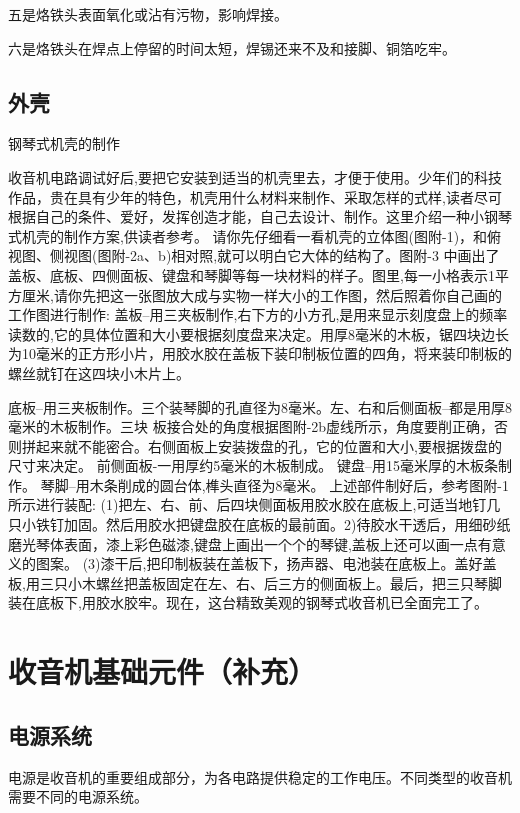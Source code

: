 \documentclass[12pt,UTF8]{ctexbook}
\begin{document}
五是烙铁头表面氧化或沾有污物，影响焊接。

六是烙铁头在焊点上停留的时间太短，焊锡还来不及和接脚、铜箔吃牢。

\chapter{外壳}

钢琴式机壳的制作

收音机电路调试好后,要把它安装到适当的机壳里去，才便于使用。少年们的科技作品，贵在具有少年的特色，机壳用什么材料来制作、采取怎样的式样,读者尽可根据自己的条件、爱好，发挥创造才能，自己去设计、制作。这里介绍一种小钢琴式机壳的制作方案,供读者参考。
请你先仔细看一看机壳的立体图(图附-1)，和俯视图、侧视图(图附-2a、b)相对照,就可以明白它大体的结构了。图附-3 中画出了盖板、底板、四侧面板、键盘和琴脚等每一块材料的样子。图里,每一小格表示1平方厘米,请你先把这一张图放大成与实物一样大小的工作图，然后照着你自己画的工作图进行制作:
盖板--用三夹板制作,右下方的小方孔,是用来显示刻度盘上的频率读数的,它的具体位置和大小要根据刻度盘来决定。用厚8毫米的木板，锯四块边长为10毫米的正方形小片，用胶水胶在盖板下装印制板位置的四角，将来装印制板的螺丝就钉在这四块小木片上。

底板--用三夹板制作。三个装琴脚的孔直径为8毫米。左、右和后侧面板--都是用厚8毫米的木板制作。三块
板接合处的角度根据图附-2b虚线所示，角度要削正确，否则拼起来就不能密合。右侧面板上安装拨盘的孔，它的位置和大小,要根据拨盘的尺寸来决定。
前侧面板-一用厚约5毫米的木板制成。
键盘--用15毫米厚的木板条制作。
琴脚--用木条削成的圆台体,榫头直径为8毫米。
上述部件制好后，参考图附-1所示进行装配:
(1)把左、右、前、后四块侧面板用胶水胶在底板上,可适当地钉几只小铁钉加固。然后用胶水把键盘胶在底板的最前面。2)待胶水干透后，用细砂纸磨光琴体表面，漆上彩色磁漆,键盘上画出一个个的琴键,盖板上还可以画一点有意义的图案。
(3)漆干后,把印制板装在盖板下，扬声器、电池装在底板上。盖好盖板,用三只小木螺丝把盖板固定在左、右、后三方的侧面板上。最后，把三只琴脚装在底板下,用胶水胶牢。现在，这台精致美观的钢琴式收音机已全面完工了。



\part{收音机基础元件（补充）}

\chapter{电源系统}

电源是收音机的重要组成部分，为各电路提供稳定的工作电压。不同类型的收音机需要不同的电源系统。
\end{document}
